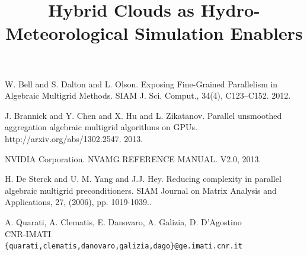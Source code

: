\documentclass[article,A4,11pt]{llncs}%
\begin{document}

\begin{thebibliography}{10}
{\sc W. Bell and S. Dalton and L. Olson}. {Exposing Fine-Grained Parallelism in Algebraic Multigrid Methods}. SIAM J. Sci. Comput., 34(4), C123–C152. 2012.

{\sc J. Brannick and Y. Chen and X. Hu and L. Zikatanov}. {Parallel unsmoothed aggregation algebraic multigrid algorithms on GPUs}. http://arxiv.org/abs/1302.2547. 2013.

{\sc NVIDIA Corporation}. {NVAMG REFERENCE MANUAL}. V2.0, 2013.

{\sc H. De Sterck and U. M. Yang and J.J. Hey}. {Reducing complexity in parallel algebraic multigrid preconditioners}. SIAM Journal on Matrix Analysis and Applications, 27, (2006), pp. 1019-1039..
\end{thebibliography}

\title{Hybrid Clouds as Hydro-Meteorological Simulation Enablers}
 \author{} \institute{}
\maketitle
\begin{center}
{\large A. Quarati, A. Clematis, E. Danovaro,  A. Galizia, D. D'Agostino}\\
CNR-IMATI\\
{\tt \{quarati,clematis,danovaro,galizia,dago\}@ge.imati.cnr.it}
\end{center}
\end{document}
